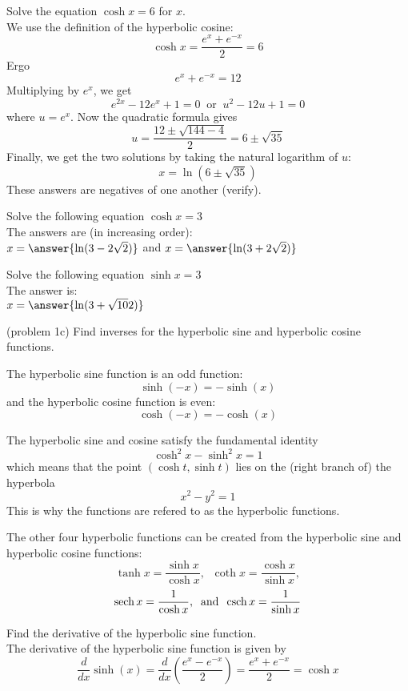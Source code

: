 \documentclass[handout]{ximera}
\begin{document}
\begin{example}[example 1]
Solve the equation $\cosh x = 6$ for $x$.\\
We use the definition of the hyperbolic cosine:
\[
\cosh x = \frac{e^x + e^{-x}}{2} = 6
\]
Ergo
\[
e^x +e^{-x} = 12
\]
Multiplying by $e^x$, we get
\[
e^{2x} - 12e^x +1 = 0 \;\; \mbox{or} \;\; u^2 - 12u + 1 = 0
\]
where $u = e^x$.  Now the quadratic formula gives
\[
u = \frac{12 \pm \sqrt{144 - 4}}{2} = 6 \pm \sqrt{35}
\]
Finally, we get the two solutions by taking the natural logarithm of $u$:
\[
x = \ln\left(6 \pm \sqrt{35}\right)
\]
These answers are negatives of one another (verify).
\end{example}

\begin{problem}[problem 1a]
Solve the following equation $\cosh x = 3$\\
The answers are (in increasing order):\\
$x = \answer{\ln(3-2\sqrt 2)}$ and $x = \answer{\ln(3+2\sqrt 2)}$
\end{problem}


\begin{problem}[problem 1b]
Solve the following equation $\sinh x = 3$\\
The answer is:\\
$x = \answer{\ln(3+\sqrt{10} 2)}$
\end{problem}

\begin{problem}(problem 1c) 
Find inverses for the hyperbolic sine and hyperbolic cosine functions.
\end{problem}

The hyperbolic sine function is an odd function:
\[
\sinh(-x) = -\sinh(x)
\]
and the hyperbolic cosine function is even:
\[
\cosh(-x) = -\cosh(x)
\]

The hyperbolic sine and cosine satisfy the fundamental identity
\[
\cosh^2 x - \sinh^2 x =1
\]
which means that the point $(\cosh t, \sinh t)$ lies on the (right branch of) the hyperbola
\[
x^2 -y^2 = 1
\]
This is why the functions are refered to as the hyperbolic functions.

The other four hyperbolic functions can be created from the hyperbolic sine and hyperbolic cosine functions:
\[
\tanh x = \frac{\sinh x}{\cosh x},\;\; \coth x = \frac{\cosh x}{\sinh x},
\]
\[
\operatorname{sech} x = \frac{1}{\cosh x}, \;\; \mbox{and}\;\; \operatorname{csch} x = \frac{1}{\sinh x}
\]

\begin{example}[example 2]
Find the derivative of the hyperbolic sine function.\\
The derivative of the hyperbolic sine function is given by
\[
\frac{d}{dx} \sinh(x) = \frac{d}{dx} \left( \frac{e^x -e^{-x}}{2} \right) = \frac{e^x + e^{-x}}{2} = \cosh x
\]
\end{example}
\end{document}
